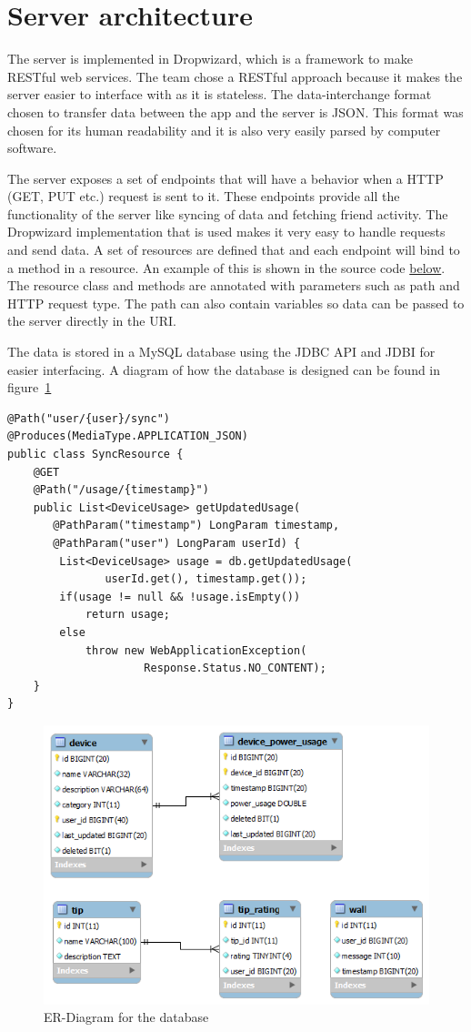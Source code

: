 \section{Server architecture}
The server is implemented in Dropwizard, which is a framework to make RESTful web services. The team chose a RESTful approach because it makes the server easier to interface with as it is stateless. The data-interchange format chosen to transfer data between the app and the server is JSON. This format was chosen for its human readability and it is also very easily parsed by computer software.

The server exposes a set of endpoints that will have a behavior when a HTTP (GET, PUT etc.) request is sent to it. These endpoints provide all the functionality of the server like syncing of data and fetching friend activity. The Dropwizard implementation that is used makes it very easy to handle requests and send data. A set of resources are defined that and each endpoint will bind to a method in a resource. An example of this is shown in the source code \hyperref[lst:dropwizardResource]{below}. The resource class and methods are annotated with parameters such as path and HTTP request type. The path can also contain variables so data can be passed to the server directly in the URI. 

The data is stored in a MySQL database using the JDBC API and JDBI for easier interfacing. A diagram of how the database is designed can be found in figure~\ref{fig:ER-Diagram}


\begin{lstlisting}[caption={Dropwizard resource example}, label={lst:dropwizardResource}]
@Path("user/{user}/sync")
@Produces(MediaType.APPLICATION_JSON)
public class SyncResource {
    @GET
    @Path("/usage/{timestamp}")
    public List<DeviceUsage> getUpdatedUsage(
	   @PathParam("timestamp") LongParam timestamp, 
	   @PathParam("user") LongParam userId) {
        List<DeviceUsage> usage = db.getUpdatedUsage(
		       userId.get(), timestamp.get());
        if(usage != null && !usage.isEmpty())
            return usage;
        else
            throw new WebApplicationException(
			         Response.Status.NO_CONTENT);
    }
}
\end{lstlisting}

\begin{figure}[H]
\includegraphics[width=\textwidth]{ch/architecture/fig/ER-Diagram.png}
\caption{ER-Diagram for the database}
\label{fig:ER-Diagram}
\end{figure}